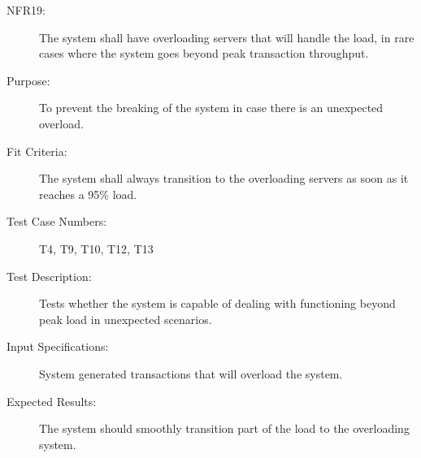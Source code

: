 \documentclass[a4paper,twoside,phd]{BYUPhys}
\begin{document}
\begin{description}
\item[NFR19:] The  system  shall  have  overloading  servers  that  will  handle  the  load, in rare cases where the system goes beyond peak transaction throughput.
\item[Purpose:] To prevent the breaking of the system in case there is an unexpected overload.
\item[Fit Criteria:] The system shall always transition to the overloading servers as soon as it reaches a 95\% load.
\item[Test Case Numbers:] T4, T9, T10, T12, T13
\item[Test Description:] Tests whether the system is capable of dealing with functioning beyond peak load in unexpected scenarios.
\item[Input Specifications:] System generated transactions that will overload the system.
\item[Expected Results:] The system should smoothly transition part of the load to the overloading system.
\end{description}
\end{document}
